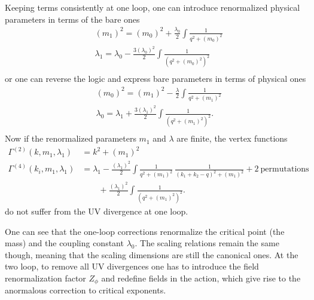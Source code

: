 \documentclass[submission, PhysLectNotes]{SciPost}
\begin{document}
Keeping terms consistently at one loop, one can introduce renormalized physical parameters in terms of the bare ones
\begin{equation}
	\begin{aligned}
		&\left(m_1\right)^2 = \left(m_0\right)^2 + \frac{\lambda_0}{2} \int \frac{1}{q^2 + \left(m_0\right)^2}\\
		&\lambda_1 = \lambda_0 - \frac{3\left(\lambda_0\right)^2}{2} \int \frac{1}{\left(q^2 + \left(m_0\right)^2\right)^2}\\ 
	\end{aligned}
\end{equation} 
or one can reverse the logic and express bare parameters in terms of physical ones
\begin{equation}
	\begin{aligned}
		&\left(m_0\right)^2 = \left(m_1\right)^2 - \frac{\lambda}{2} \int \frac{1}{q^2 + \left(m_1\right)^2}\\
		&\lambda_0 = \lambda_1 + \frac{3\left(\lambda_1\right)^2}{2} \int \frac{1}{\left(q^2 + \left(m_1\right)^2\right)^2}.\\ 
	\end{aligned}
\end{equation} 
Now if the renormalized parameters $m_1$ and $\lambda$ are finite, the vertex functions 
\begin{equation}
	\begin{aligned}
		\Gamma^{(2)}(k,m_1,\lambda_1) &= k^2 + \left(m_1\right)^2\\
		\Gamma^{(4)}(k_i,m_1,\lambda_1) &= \lambda_1 - \frac{\left(\lambda_1\right)^2}{2} \int \frac{1}{q^2 + \left(m_1\right)^2}\ \frac{1}{\left(k_1 + k_2-q\right)^2 + \left(m_1\right)^2} + \mathrm{2\ permutations}\\
		& \qquad + \frac{\left(\lambda_1\right)^2}{2} \int \frac{1}{\left(q^2 + \left(m_1\right)^2\right)^2}.
	\end{aligned}
\end{equation}
do not suffer from the UV divergence at one loop.

One can see that the one-loop corrections renormalize the critical point (the mass) and the coupling constant $\lambda_0$. The scaling relations remain the same though, meaning that the scaling dimensions are still the canonical ones. At the two loop, to remove all UV divergences one has to introduce the field renormalization factor $Z_\phi$ and redefine fields in the action, which give rise to the anormalous correction to critical exponents.
\end{document}
